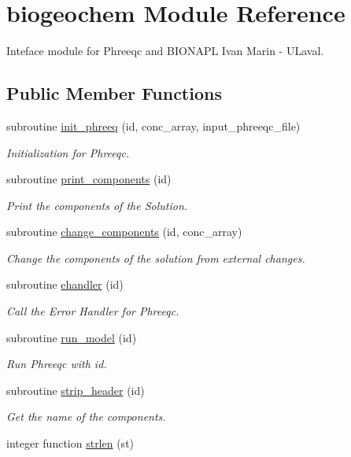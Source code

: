 \hypertarget{classbiogeochem}{\section{biogeochem Module Reference}
\label{classbiogeochem}
}


Inteface module for Phreeqc and B\-I\-O\-N\-A\-P\-L Ivan Marin -\/ U\-Laval.  


\subsection*{Public Member Functions}
\begin{DoxyCompactItemize}
\item 
subroutine \hyperlink{classbiogeochem_ad8fd793d4cfc98786926e183de153627}{init\-\_\-phreeq} (id, conc\-\_\-array, input\-\_\-phreeqc\-\_\-file)
\begin{DoxyCompactList}\small\item\em Initialization for Phreeqc. \end{DoxyCompactList}\item 
subroutine \hyperlink{classbiogeochem_adb74153c93ecca886574917ee42c6ad4}{print\-\_\-components} (id)
\begin{DoxyCompactList}\small\item\em Print the components of the Solution. \end{DoxyCompactList}\item 
subroutine \hyperlink{classbiogeochem_a1bd3b9b68060375fda3f248bc9797483}{change\-\_\-components} (id, conc\-\_\-array)
\begin{DoxyCompactList}\small\item\em Change the components of the solution from external changes. \end{DoxyCompactList}\item 
subroutine \hyperlink{classbiogeochem_a3864bdb83fa859558ffd718a003a2e7f}{ehandler} (id)
\begin{DoxyCompactList}\small\item\em Call the Error Handler for Phreeqc. \end{DoxyCompactList}\item 
subroutine \hyperlink{classbiogeochem_aed9b27100fe15ac5cfdefac055284e62}{run\-\_\-model} (id)
\begin{DoxyCompactList}\small\item\em Run Phreeqc with id. \end{DoxyCompactList}\item 
subroutine \hyperlink{classbiogeochem_add7c48f9d701a9b9a8103e11126fca70}{strip\-\_\-header} (id)
\begin{DoxyCompactList}\small\item\em Get the name of the components. \end{DoxyCompactList}\item 
integer function \hyperlink{classbiogeochem_afa3f375147a0c61940384264972aa6cb}{strlen} (st)
\end{DoxyCompactItemize}


